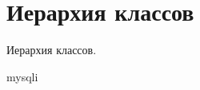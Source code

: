 \section{Иерархия классов}
Иерархия классов.\begin{DoxyCompactList}
\item {}
\item mysqli\begin{DoxyCompactList}
\item {}
\end{DoxyCompactList}
\item {}
\end{DoxyCompactList}
